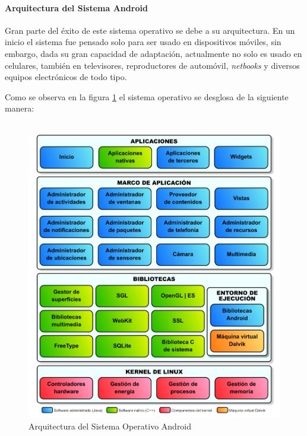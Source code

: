 \paragraph{Arquitectura del Sistema Android}

Gran parte del éxito de este sistema operativo se debe a su arquitectura. En un inicio el sistema fue pensado solo para ser usado en dispositivos móviles, sin embargo, dada su gran capacidad de adaptación, actualmente no solo es usado en celulares, también en televisores, reproductores de automóvil, \textit{netbooks} y diversos equipos electrónicos de todo tipo.

Como se observa en la figura \ref{fig:archi} el sistema operativo se desglosa de la siguiente manera:
\\
\\
\begin{figure}[h]
	\begin{center}
		\includegraphics[scale=0.6]{imagenes/pila-software-android.png}
	\end{center}
	\caption{
		\label{fig:archi}
		Arquitectura del Sistema Operativo Android
	}
\end{figure}


